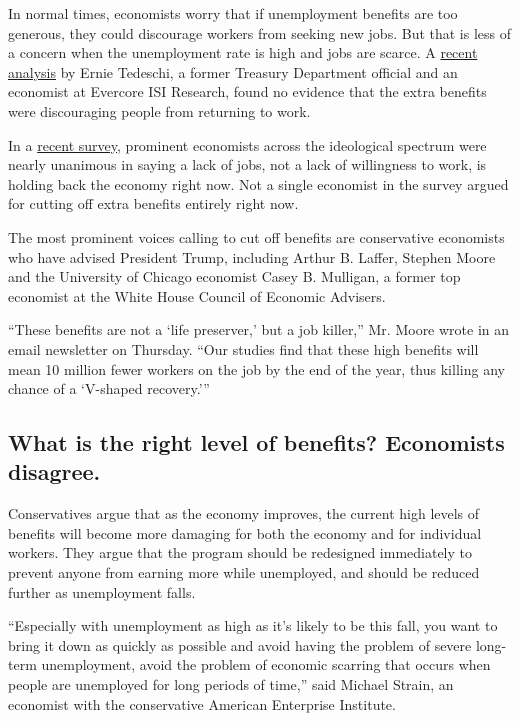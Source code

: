 In normal times, economists worry that if unemployment benefits are too
generous, they could discourage workers from seeking new jobs. But that
is less of a concern when the unemployment rate is high and jobs are
scarce. A
\href{https://twitter.com/ernietedeschi/status/1283832188434362368}{recent
analysis} by Ernie Tedeschi, a former Treasury Department official and
an economist at Evercore ISI Research, found no evidence that the extra
benefits were discouraging people from returning to work.

In a
\href{http://www.igmchicago.org/surveys/jobs-and-unemployment-insurance/}{recent
survey}, prominent economists across the ideological spectrum were
nearly unanimous in saying a lack of jobs, not a lack of willingness to
work, is holding back the economy right now. Not a single economist in
the survey argued for cutting off extra benefits entirely right now.

The most prominent voices calling to cut off benefits are conservative
economists who have advised President Trump, including Arthur B. Laffer,
Stephen Moore and the University of Chicago economist Casey B. Mulligan,
a former top economist at the White House Council of Economic Advisers.

``These benefits are not a `life preserver,' but a job killer,'' Mr.
Moore wrote in an email newsletter on Thursday. ``Our studies find that
these high benefits will mean 10 million fewer workers on the job by the
end of the year, thus killing any chance of a `V-shaped recovery.'''

\hypertarget{what-is-the-right-level-of-benefits-economists-disagree}{%
\subsection{What is the right level of benefits? Economists
disagree.}\label{what-is-the-right-level-of-benefits-economists-disagree}}

Conservatives argue that as the economy improves, the current high
levels of benefits will become more damaging for both the economy and
for individual workers. They argue that the program should be redesigned
immediately to prevent anyone from earning more while unemployed, and
should be reduced further as unemployment falls.

``Especially with unemployment as high as it's likely to be this fall,
you want to bring it down as quickly as possible and avoid having the
problem of severe long-term unemployment, avoid the problem of economic
scarring that occurs when people are unemployed for long periods of
time,'' said Michael Strain, an economist with the conservative American
Enterprise Institute.

